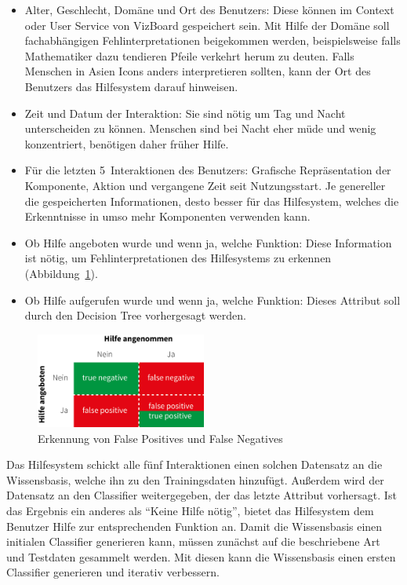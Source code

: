 \documentclass[
	headsepline,
	footsepline,
	fontsize=12pt,
	bibliography=totoc
]{scrbook}
\begin{document}
\begin{itemize}
	\item Alter, Geschlecht, Domäne und Ort des Benutzers: Diese können im Context oder User Service von VizBoard gespeichert sein. Mit Hilfe der Domäne soll fachabhängigen Fehlinterpretationen beigekommen werden, beispielsweise falls Mathematiker dazu tendieren Pfeile verkehrt herum zu deuten. Falls Menschen in Asien Icons anders interpretieren sollten, kann der Ort des Benutzers das Hilfesystem darauf hinweisen.
	\item Zeit und Datum der Interaktion: Sie sind nötig um Tag und Nacht unterscheiden zu können. Menschen sind bei Nacht eher müde und wenig konzentriert, benötigen daher früher Hilfe.
	\item Für die letzten 5~Interaktionen des Benutzers: Grafische Repräsentation der Komponente, Aktion und vergangene Zeit seit Nutzungsstart. Je genereller die gespeicherten Informationen, desto besser für das Hilfesystem, welches die Erkenntnisse in umso mehr Komponenten verwenden kann.
	\item Ob Hilfe angeboten wurde und wenn ja, welche Funktion: Diese Information ist nötig, um Fehlinterpretationen des Hilfesystems zu erkennen (Abbildung~\ref{figure:meta-dyn-id}).
	\item Ob Hilfe aufgerufen wurde und wenn ja, welche Funktion: Dieses Attribut soll durch den Decision Tree vorhergesagt werden.
\end{itemize}

\begin{figure}[htbp]
   \centering
   \includegraphics[width=0.5\textwidth]{images/konzeption-meta-dyn-id.png}
   \caption{Erkennung von False Positives und False Negatives}
   \label{figure:meta-dyn-id}
\end{figure}

Das Hilfesystem schickt alle fünf Interaktionen einen solchen Datensatz an die Wissensbasis, welche ihn zu den Trainingsdaten hinzufügt. Außerdem wird der Datensatz an den Classifier weitergegeben, der das letzte Attribut vorhersagt. Ist das Ergebnis ein anderes als \enquote{Keine Hilfe nötig}, bietet das Hilfesystem dem Benutzer Hilfe zur entsprechenden Funktion an. Damit die Wissensbasis einen initialen Classifier generieren kann, müssen zunächst auf die beschriebene Art und Testdaten gesammelt werden. Mit diesen kann die Wissensbasis einen ersten Classifier generieren und iterativ verbessern.
\end{document}
